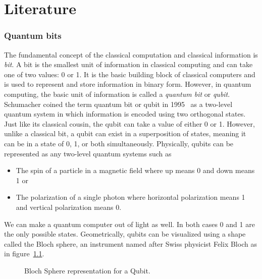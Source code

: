 \chapter{Literature}
\label{section:literature}

\subsection{Quantum bits}

The fundamental concept of the classical computation and classical information is \textit{bit}. A bit is the smallest unit of information in classical computing and can take one of two values: 0 or 1. It is the basic building block of classical computers and is used to represent and store information in binary form. However, in quantum computing, the basic unit of information is called a \textit{quantum bit} or \textit{qubit}. %
Schumacher coined the term quantum bit or qubit in 1995~\cite{schumacher1995QuantumCoding} as a two-level quantum system in which information is encoded using two orthogonal states. Just like its classical cousin, the qubit can take a value of either 0 or 1. However, unlike a classical bit, a qubit can exist in a superposition of states, meaning it can be in a state of 0, 1, or both simultaneously. 
Physically, qubits can be represented as any two-level quantum systems such as
\begin{itemize}
  \item The spin of a particle in a magnetic field where up means 0 and down means 1 or
  \item The polarization of a single photon where horizontal polarization means 1 and vertical polarization means 0.
\end{itemize}

We can make a quantum computer out of light as well. In both cases 0 and 1 are the only possible states. Geometrically, qubits can be visualized using a shape called the Bloch sphere, an instrument named after Swiss physicist Felix Bloch as in figure~\ref{fig:blochSphere}.
\begin{figure}[H]
\centering
{}
\caption{Bloch Sphere representation for a Qubit.}
\label{fig:blochSphere}
\end{figure}


